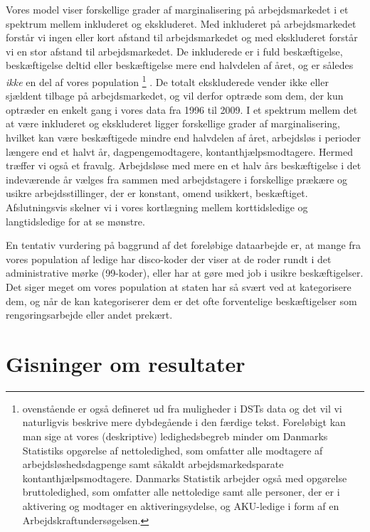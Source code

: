 Vores model viser forskellige grader af marginalisering på arbejdsmarkedet i et spektrum mellem inkluderet og ekskluderet. Med inkluderet på arbejdsmarkedet forstår vi ingen eller kort afstand til arbejdsmarkedet og med ekskluderet forstår vi en stor afstand til arbejdsmarkedet. De inkluderede er i fuld beskæftigelse, beskæftigelse deltid eller beskæftigelse mere end halvdelen af året, og er således \emph{ikke} en del af vores population%
%
\footnote{ovenstående er også defineret ud fra muligheder i DSTs data og det vil vi naturligvis beskrive mere dybdegående i den færdige tekst. Foreløbigt kan man sige at vores (deskriptive) ledighedsbegreb minder om Danmarks Statistiks opgørelse af nettoledighed, som omfatter alle modtagere af arbejdsløshedsdagpenge samt såkaldt arbejdsmarkedsparate kontanthjælpsmodtagere. Danmarks Statistik arbejder også med opgørelse bruttoledighed, som  omfatter alle nettoledige samt alle personer, der er i aktivering og modtager en aktiveringsydelse, og AKU-ledige i form af en Arbejdskraftundersøgelsen.}%
%
. De totalt ekskluderede vender ikke eller sjældent tilbage på arbejdsmarkedet, og vil derfor optræde som dem, der kun optræder en enkelt gang i vores data fra 1996 til 2009. I et spektrum mellem det at være inkluderet og ekskluderet ligger forskellige grader af marginalisering, hvilket kan være beskæftigede mindre end halvdelen af året, arbejdsløs i perioder længere end et halvt år, dagpengemodtagere, kontanthjælpsmodtagere. Hermed træffer vi også et fravalg. Arbejdsløse med mere en et halv års beskæftigelse i det indeværende år vælges fra sammen med arbejdstagere i forskellige prækære og usikre arbejdsstillinger, der er konstant, omend usikkert, beskæftiget. Afslutningsvis skelner vi i vores kortlægning mellem korttidsledige og langtidsledige for at se mønstre.

En tentativ vurdering på baggrund af det foreløbige dataarbejde er, at mange fra vores population af ledige har disco-koder der viser at de roder rundt i det administrative mørke (99-koder), eller har at gøre med job i usikre beskæftigelser. Det siger meget om vores population at staten har så svært ved at kategorisere dem, og når de kan kategoriserer dem er det ofte forventelige beskæftigelser som rengøringsarbejde eller andet prekært.   

\section{Gisninger om resultater} %

